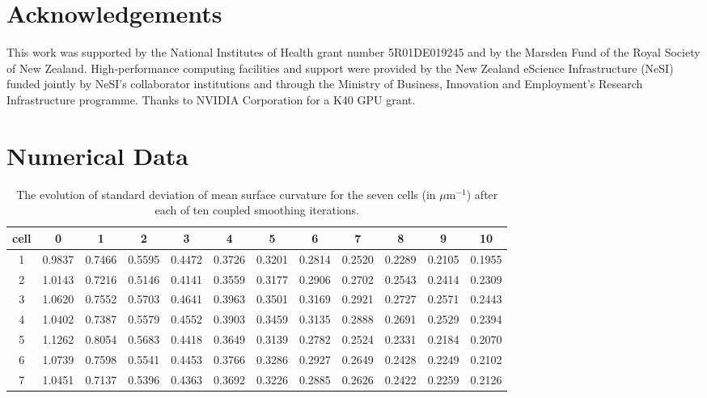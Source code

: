 \documentclass[a4paper,10pt]{article}
\begin{document}
\section{Acknowledgements}
This work was supported by the National Institutes of Health grant number 5R01DE019245 and by the Marsden Fund of the Royal Society of New Zealand. High-performance computing facilities and support were provided by the New Zealand eScience Infrastructure (NeSI) funded jointly by NeSI's collaborator institutions and through the Ministry of Business, Innovation and Employment's Research Infrastructure programme. Thanks to NVIDIA Corporation for a K40 GPU grant.\\




\pagebreak
\appendix

\section{Numerical Data}

\begin{table}[H]
\begin{center}
\footnotesize
\begin{tabular}{|c|ccccccccccc|}
\hline
cell & 0 &1 &2 &3 &4 &5 &6 &7 &8 &9 &10\\
\hline

1 &0.9837 &0.7466 &0.5595 &0.4472 &0.3726 &0.3201 &0.2814 &0.2520 &0.2289 &0.2105 &0.1955\\
2 &1.0143 &0.7216 &0.5146 &0.4141 &0.3559 &0.3177 &0.2906 &0.2702 &0.2543 &0.2414 &0.2309\\
3 &1.0620 &0.7552 &0.5703 &0.4641 &0.3963 &0.3501 &0.3169 &0.2921 &0.2727 &0.2571 &0.2443\\
4 &1.0402 &0.7387 &0.5579 &0.4552 &0.3903 &0.3459 &0.3135 &0.2888 &0.2691 &0.2529 &0.2394\\
5 &1.1262 &0.8054 &0.5683 &0.4418 &0.3649 &0.3139 &0.2782 &0.2524 &0.2331 &0.2184 &0.2070\\
6 &1.0739 &0.7598 &0.5541 &0.4453 &0.3766 &0.3286 &0.2927 &0.2649 &0.2428 &0.2249 &0.2102\\
7 &1.0451 &0.7137 &0.5396 &0.4363 &0.3692 &0.3226 &0.2885 &0.2626 &0.2422 &0.2259 &0.2126\\
\hline
\end{tabular}
\end{center}
\caption{The evolution of standard deviation of mean surface curvature for the seven cells (in $\mu \text{m}^{-1}$)  after each of ten coupled smoothing iterations.}
\label{tab:curv}
\end{table}
\end{document}
